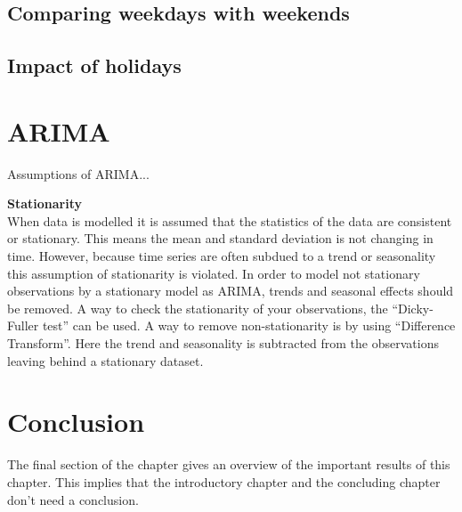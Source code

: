 \subsection{Comparing weekdays with weekends}

\subsection{Impact of holidays}



\section{ARIMA}
Assumptions of ARIMA...

\textbf{Stationarity}\\
When data is modelled it is assumed that the statistics of the data are consistent or stationary. This means the mean and standard deviation is not changing in time. However, because time series are often subdued to a trend or seasonality this assumption of stationarity is violated. In order to model not stationary observations by a stationary model as ARIMA, trends and seasonal effects should be removed. A way to check the stationarity of your observations, the ``Dicky-Fuller test'' can be used.
A way to remove non-stationarity is by using ``Difference Transform''. Here the trend and seasonality is subtracted from the observations leaving behind a stationary dataset.


\section{Conclusion}
The final section of the chapter gives an overview of the important results
of this chapter. This implies that the introductory chapter and the
concluding chapter don't need a conclusion.





